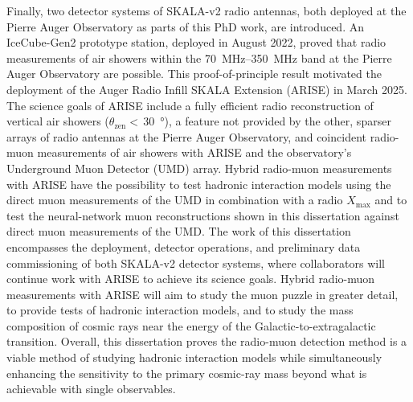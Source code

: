 Finally, two detector systems of SKALA-v2 radio antennas, both deployed at the Pierre Auger Observatory as parts of this PhD work, are introduced.
An IceCube-Gen2 prototype station, deployed in August 2022, proved that radio measurements of air showers within the \qtyrange{70}{350}{\mega\hertz} band at the Pierre Auger Observatory are possible.
This proof-of-principle result motivated the deployment of the Auger Radio Infill SKALA Extension (ARISE) in March 2025.
The science goals of ARISE include a fully efficient radio reconstruction of vertical air showers ($\theta_{\text{zen}}<$\,\qty{30}{\degree}), a feature not provided by the other, sparser arrays of radio antennas at the Pierre Auger Observatory, and coincident radio-muon measurements of air showers with ARISE and the observatory's Underground Muon Detector (UMD) array.
Hybrid radio-muon measurements with ARISE have the possibility to test hadronic interaction models using the direct muon measurements of the UMD in combination with a radio $X_{\text{max}}$ and to test the neural-network muon reconstructions shown in this dissertation against direct muon measurements of the UMD.
The work of this dissertation encompasses the deployment, detector operations, and preliminary data commissioning of both SKALA-v2 detector systems, where collaborators will continue work with ARISE to achieve its science goals.
Hybrid radio-muon measurements with ARISE will aim to study the muon puzzle in greater detail, to provide tests of hadronic interaction models, and to study the mass composition of cosmic rays near the energy of the Galactic-to-extragalactic transition.
Overall, this dissertation proves the radio-muon detection method is a viable method of studying hadronic interaction models while simultaneously enhancing the sensitivity to the primary cosmic-ray mass beyond what is achievable with single observables.






